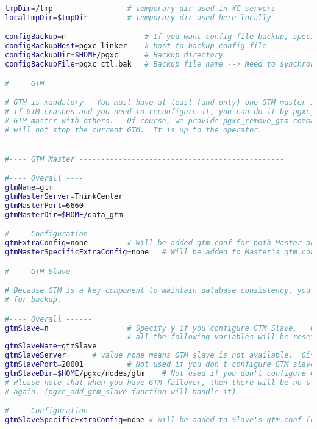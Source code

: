 \begin{lstlisting}[language=bash,caption={Konfigurationsdatei pgxc-ctl}]
tmpDir=/tmp					# temporary dir used in XC servers
localTmpDir=$tmpDir			# temporary dir used here locally

configBackup=n					# If you want config file backup, specify y to this value.
configBackupHost=pgxc-linker	# host to backup config file
configBackupDir=$HOME/pgxc		# Backup directory
configBackupFile=pgxc_ctl.bak	# Backup file name --> Need to synchronize when original changed.

#---- GTM ------------------------------------------------------------------------------------

# GTM is mandatory.  You must have at least (and only) one GTM master in your Postgres-XC cluster.
# If GTM crashes and you need to reconfigure it, you can do it by pgxc_update_gtm command to update
# GTM master with others.   Of course, we provide pgxc_remove_gtm command to remove it.  This command
# will not stop the current GTM.  It is up to the operator.


#---- GTM Master -----------------------------------------------

#---- Overall ----
gtmName=gtm
gtmMasterServer=ThinkCenter
gtmMasterPort=6660
gtmMasterDir=$HOME/data_gtm

#---- Configuration ---
gtmExtraConfig=none			# Will be added gtm.conf for both Master and Slave (done at initilization only)
gtmMasterSpecificExtraConfig=none	# Will be added to Master's gtm.conf (done at initialization only)

#---- GTM Slave -----------------------------------------------

# Because GTM is a key component to maintain database consistency, you may want to configure GTM slave
# for backup.

#---- Overall ------
gtmSlave=n					# Specify y if you configure GTM Slave.   Otherwise, GTM slave will not be configured and
							# all the following variables will be reset.
gtmSlaveName=gtmSlave
gtmSlaveServer=		# value none means GTM slave is not available.  Give none if you don't configure GTM Slave.
gtmSlavePort=20001			# Not used if you don't configure GTM slave.
gtmSlaveDir=$HOME/pgxc/nodes/gtm	# Not used if you don't configure GTM slave.
# Please note that when you have GTM failover, then there will be no slave available until you configure the slave
# again. (pgxc_add_gtm_slave function will handle it)

#---- Configuration ----
gtmSlaveSpecificExtraConfig=none # Will be added to Slave's gtm.conf (done at initialization only)


\end{lstlisting}
